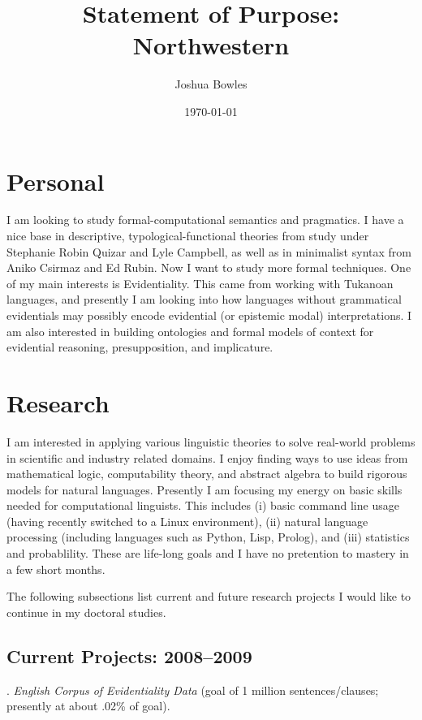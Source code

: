 \documentclass[11pt]{article}
\begin{document}
\author{Joshua Bowles}
\title{Statement of Purpose: Northwestern}
\date{\today}


\maketitle
\section{Personal}
I am looking to study formal-computational semantics and pragmatics. I have a nice base in descriptive, typological-functional theories from study under Stephanie Robin Quizar and Lyle Campbell, as well as in minimalist syntax from Aniko Csirmaz and Ed Rubin. Now I want to study more formal techniques. One of my main interests is Evidentiality. This came from working with Tukanoan languages, and presently I am looking into how languages without grammatical evidentials may possibly encode evidential (or epistemic modal) interpretations. I am also interested in building ontologies and formal models of context for evidential reasoning, presupposition, and implicature. 

\section{Research}
I am interested in applying various linguistic theories to solve real-world problems in scientific and industry related domains. I enjoy finding ways to use ideas from mathematical logic, computability theory, and abstract algebra to build rigorous models for natural languages. Presently I am focusing my energy on basic skills needed for computational linguists. This includes (i) basic command line usage (having recently switched to a Linux environment), (ii) natural language processing (including languages such as Python, Lisp, Prolog), and (iii) statistics and probablility. These are life-long goals and I have no pretention to mastery in a few short months.   

The following subsections list current and future research projects I would like to continue in my doctoral studies. 

\subsection{Current Projects: 2008--2009}
\ex. \textsl{English Corpus of Evidentiality Data} (goal of 1 million sentences/clauses; presently at about .02\% of goal).
\end{document}
